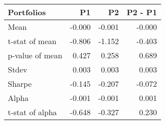 \begin{tabular}{lrrr}
\toprule
Portfolios & P1 & P2 & P2 - P1 \\
\midrule
Mean & -0.000 & -0.001 & -0.000 \\
t-stat of mean & -0.806 & -1.152 & -0.403 \\
p-value of mean & 0.427 & 0.258 & 0.689 \\
Stdev & 0.003 & 0.003 & 0.003 \\
Sharpe & -0.145 & -0.207 & -0.072 \\
Alpha & -0.001 & -0.001 & 0.001 \\
t-stat of alpha & -0.648 & -0.327 & 0.230 \\
\bottomrule
\end{tabular}
